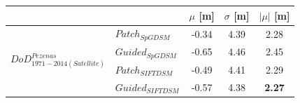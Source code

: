 \begin{table}%
	\footnotesize
	\centering
	\begin{tabular}{||l|l|c|c|c||}\hline
		& &$\mu$ [m]&$\sigma$ [m]&$|\mu|$ [m]\\\hline\hline
%		
%		
		
		\multirow{4}{*}{$DoD^{Pezenas}_{1971-2014(Satellite)}$}
&${Patch_{SpGDSM}}$ & -0.34 & 4.39 & 2.28\\
&${Guided_{SpGDSM}}$ & -0.65 & 4.46 & 2.45\\
&${Patch_{SIFTDSM}}$ & -0.49 & 4.41 & 2.29\\
&${Guided_{SIFTDSM}}$ & -0.57 & 4.38 & \textbf{2.27}\\\hline


				

\end{tabular}
\end{table}
